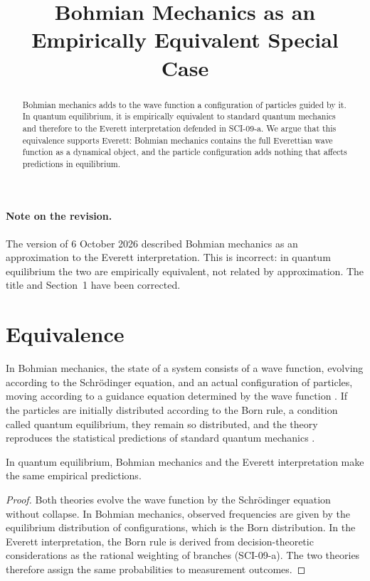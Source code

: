 \documentclass{situationist-preprint}
\title{Bohmian Mechanics as an Empirically Equivalent Special Case}
\begin{document}
\maketitle

\begin{abstract}
Bohmian mechanics adds to the wave function a configuration of particles guided by it. In quantum equilibrium, it is empirically equivalent to standard quantum mechanics and therefore to the Everett interpretation defended in SCI-09-a. We argue that this equivalence supports Everett: Bohmian mechanics contains the full Everettian wave function as a dynamical object, and the particle configuration adds nothing that affects predictions in equilibrium.
\end{abstract}

\paragraph{Note on the revision.} The version of 6 October 2026 described Bohmian mechanics as an approximation to the Everett interpretation. This is incorrect: in quantum equilibrium the two are empirically equivalent, not related by approximation. The title and Section~1 have been corrected.

\section{Equivalence}

In Bohmian mechanics, the state of a system consists of a wave function, evolving according to the Schrödinger equation, and an actual configuration of particles, moving according to a guidance equation determined by the wave function \citep{Bohm1952}. If the particles are initially distributed according to the Born rule, a condition called quantum equilibrium, they remain so distributed, and the theory reproduces the statistical predictions of standard quantum mechanics \citep{DurrGoldsteinZanghi1992}.

\begin{proposition}\label{p:eq}
In quantum equilibrium, Bohmian mechanics and the Everett interpretation make the same empirical predictions.
\end{proposition}

\begin{proof}
Both theories evolve the wave function by the Schrödinger equation without collapse. In Bohmian mechanics, observed frequencies are given by the equilibrium distribution of configurations, which is the Born distribution. In the Everett interpretation, the Born rule is derived from decision-theoretic considerations as the rational weighting of branches (SCI-09-a). The two theories therefore assign the same probabilities to measurement outcomes.
\end{proof}
\end{document}
